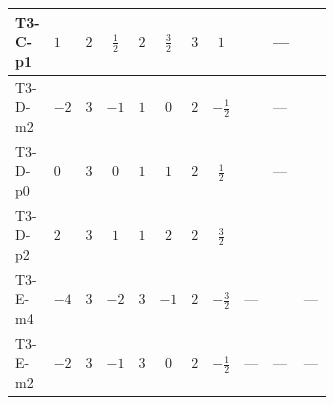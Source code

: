 \documentclass[8pt]{article}
\begin{document}
\begin{landscape}
\begin{longtable}{@{}llcccccc >{\raggedright\arraybackslash}p{0.21\linewidth} >{\raggedright\arraybackslash}p{0.21\linewidth} >{\raggedright\arraybackslash}p{0.21\linewidth}@{}}
\midrule
T3-C-p1 & $1$ & $2$ & $\frac{1}{2}$ & $2$ & $\frac{3}{2}$ & $3$ & $1$ & \scriptsize\adjustbox{max width=\linewidth}{$\begin{gathered} -9 {g_2}^2 {\lambda_{12}^{(1)}}\end{gathered}$} & --- & \scriptsize\adjustbox{max width=\linewidth}{$\begin{gathered} -15 {g_1}^2 {\lambda_{12}^{(1)}}\end{gathered}$} \\
\midrule
T3-D-m2 & $-2$ & $3$ & $-1$ & $1$ & $0$ & $2$ & $-\frac{1}{2}$ & \scriptsize\adjustbox{max width=\linewidth}{$\begin{gathered} -12 {g_2}^2 {\lambda_{12}^{(1)}}\end{gathered}$} & --- & \scriptsize\adjustbox{max width=\linewidth}{$\begin{gathered} -6 {g_1}^2 {\lambda_{12}^{(1)}}\end{gathered}$} \\
\midrule
T3-D-p0 & $0$ & $3$ & $0$ & $1$ & $1$ & $2$ & $\frac{1}{2}$ & \scriptsize\adjustbox{max width=\linewidth}{$\begin{gathered} -12 {g_2}^2 {\lambda_{12}^{(1)}}\end{gathered}$} & --- & \scriptsize\adjustbox{max width=\linewidth}{$\begin{gathered} -6 {g_1}^2 {\lambda_{12}^{(1)}}\end{gathered}$} \\
\midrule
T3-D-p2 & $2$ & $3$ & $1$ & $1$ & $2$ & $2$ & $\frac{3}{2}$ & \scriptsize\adjustbox{max width=\linewidth}{$\begin{gathered} -12 {g_2}^2 {\lambda_{12}^{(1)}}\end{gathered}$} & \scriptsize\adjustbox{max width=\linewidth}{$\begin{gathered} +48 {g_1}^4\end{gathered}$} & \scriptsize\adjustbox{max width=\linewidth}{$\begin{gathered} -30 {g_1}^2 {\lambda_{12}^{(1)}}\end{gathered}$} \\
\midrule
T3-E-m4 & $-4$ & $3$ & $-2$ & $3$ & $-1$ & $2$ & $-\frac{3}{2}$ & --- & \scriptsize\adjustbox{max width=\linewidth}{$\begin{gathered} +48 {g_1}^4\end{gathered}$} & --- \\
\midrule
T3-E-m2 & $-2$ & $3$ & $-1$ & $3$ & $0$ & $2$ & $-\frac{1}{2}$ & --- & --- & --- \\

\end{longtable}
\end{landscape}
\end{document}
